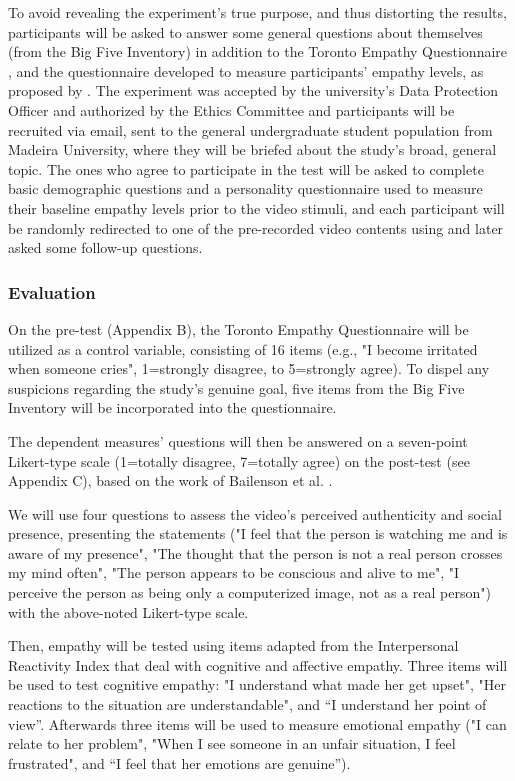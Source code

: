 To avoid revealing the experiment's true purpose, and thus distorting the results, participants will be asked to answer some general questions about themselves (from the Big Five Inventory) in addition to the Toronto Empathy Questionnaire \cite{SPR03}, and the questionnaire developed to measure participants' empathy levels, as proposed by \cite{ROT19, ZIB19}. 
The experiment was accepted by the university's Data Protection Officer and authorized by the Ethics Committee and participants will be recruited via email, sent to the general undergraduate student population from Madeira University, where they will be briefed about the study's broad, general topic.
The ones who agree to participate in the test will be asked to complete basic demographic questions and a personality questionnaire used to measure their baseline empathy levels prior to the video stimuli, and each participant will be randomly redirected to one of the pre-recorded video contents using \cite{FER19} and later asked some follow-up questions.

\subsubsection{Evaluation}
On the pre-test (Appendix B), the Toronto Empathy Questionnaire \cite{SPR03} will be utilized as a control variable, consisting of 16 items (e.g., "I become irritated when someone cries", 1=strongly disagree, to 5=strongly agree). To dispel any suspicions regarding the study's genuine goal, five items from the Big Five Inventory \cite{JOH91} will be incorporated into the questionnaire.

The dependent measures' questions will then be answered on a seven-point Likert-type scale (1=totally disagree, 7=totally agree) on the post-test (see Appendix C), based on the work of Bailenson et al. \cite{BAI03}.

We will use four questions to assess the video's perceived authenticity and social presence, presenting the statements ("I feel that the person is watching me and is aware of my presence", "The thought that the person is not a real person crosses my mind often", "The person appears to be conscious and alive to me", "I perceive the person as being only a computerized image, not as a real person") with the above-noted Likert-type scale.

Then, empathy will be tested using items adapted from the Interpersonal Reactivity Index \cite{DAV83} that deal with cognitive and affective empathy. Three items will be used to test cognitive empathy: "I understand what made her get upset", "Her reactions to the situation are understandable", and “I understand her point of view”. Afterwards three items will be used to measure emotional empathy ("I can relate to her problem", "When I see someone in an unfair situation, I feel frustrated", and “I feel that her emotions are genuine”).

